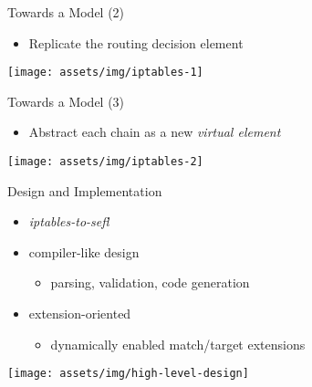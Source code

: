\documentclass{beamer}
\begin{document}
\begin{frame}[t]{Towards a Model (2)}
  \begin{itemize}
    \item[2.] Replicate the routing decision element
  \end{itemize}

  \vspace*{0.8cm}

  \centering
  \texttt{[image: assets/img/iptables-1]}
\end{frame}

\begin{frame}[t]{Towards a Model (3)}
  \begin{itemize}
    \item[3.] Abstract each chain as a new \emph{virtual element}
  \end{itemize}

  \vspace*{0.8cm}

  \centering
  \texttt{[image: assets/img/iptables-2]}
\end{frame}

\begin{frame}{Design and Implementation}
  \begin{itemize}
    \item \emph{iptables-to-sefl}
    \item compiler-like design
      \begin{itemize}
        \item[--] parsing, validation, code generation
      \end{itemize}
    \item extension-oriented
      \begin{itemize}
        \item[--] dynamically enabled match/target extensions
      \end{itemize}
  \end{itemize}

  \centering
  \texttt{[image: assets/img/high-level-design]}
\end{frame}
\end{document}
